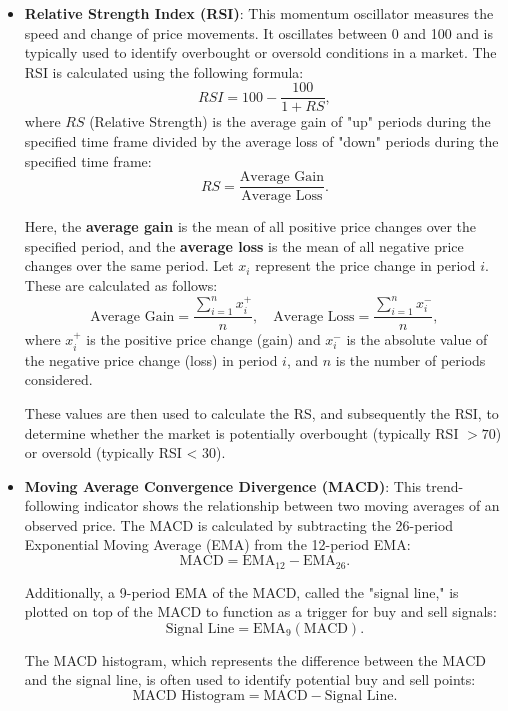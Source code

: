 \begin{itemize}
	\item \textbf{Relative Strength Index (RSI)}: This momentum oscillator measures the speed and change of price movements. It oscillates between 0 and 100 and is typically used to identify overbought or oversold conditions in a market. The RSI is calculated using the following formula:
	      \[
		      RSI = 100 - \frac{100}{1 + RS},
	      \]
	      where \( RS \) (Relative Strength) is the average gain of "up" periods during the specified time frame divided by the average loss of "down" periods during the specified time frame:
	      \[
		      RS = \frac{\text{Average Gain}}{\text{Average Loss}}.
	      \]

	      Here, the \textbf{average gain} is the mean of all positive price changes over the specified period, and the \textbf{average loss} is the mean of all negative price changes over the same period. Let \( x_i \) represent the price change in period \( i \). These are calculated as follows:
	      \[
		      \text{Average Gain} = \frac{\sum_{i=1}^{n} x_i^+}{n}, \quad \text{Average Loss} = \frac{\sum_{i=1}^{n} x_i^-}{n},
	      \]
	      where \( x_i^+ \) is the positive price change (gain) and \( x_i^- \) is the absolute value of the negative price change (loss) in period \( i \), and \( n \) is the number of periods considered.

	      These values are then used to calculate the RS, and subsequently the RSI, to determine whether the market is potentially overbought (typically RSI $> 70$) or oversold (typically RSI < 30).


	\item \textbf{Moving Average Convergence Divergence (MACD)}: This trend-following indicator shows the relationship between two moving averages of an observed price. The MACD is calculated by subtracting the 26-period Exponential Moving Average (EMA) from the 12-period EMA:
	      \[
		      \text{MACD} = \text{EMA}_{12} - \text{EMA}_{26}.
	      \]

	      Additionally, a 9-period EMA of the MACD, called the "signal line," is plotted on top of the MACD to function as a trigger for buy and sell signals:
	      \[
		      \text{Signal Line} = \text{EMA}_{9}(\text{MACD}).
	      \]

	      The MACD histogram, which represents the difference between the MACD and the signal line, is often used to identify potential buy and sell points:
	      \[
		      \text{MACD Histogram} = \text{MACD} - \text{Signal Line}.
	      \]


\end{itemize}
